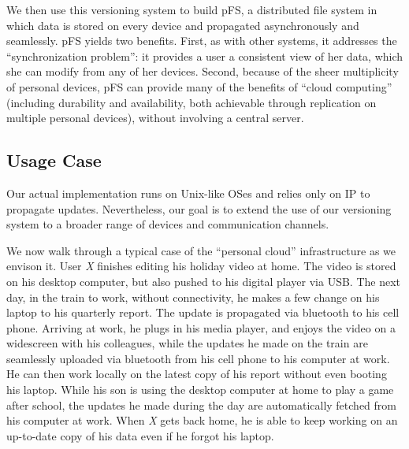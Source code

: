 We then use this versioning system to build pFS, a distributed file
system in which data is stored on every device and propagated
asynchronously and seamlessly. pFS yields two benefits. First, as with
other systems, it addresses the ``synchronization problem'': it provides
a user a consistent view of her data, which she can modify from any of her
devices. Second, because of the sheer multiplicity of personal devices,
pFS can provide many of the benefits of ``cloud computing'' (including
durability and availability, both achievable through replication on
multiple personal devices),  without involving a central server. 

%

\subsection{Usage Case}

Our actual implementation runs on Unix-like OSes and relies only on IP
to propagate updates. Nevertheless, our goal is to extend the use of
our versioning system to a broader range of devices and communication
channels.
\fi

\fi

We now walk through a typical 
case of the ``personal cloud'' infrastructure as we envison it. User
\emph{X} finishes editing his holiday video at home. The video is
stored on his desktop computer, but also pushed to his digital player
via USB. The next day, in the train to work, without connectivity, he
makes a few change on his laptop to his quarterly report. The update
is propagated via bluetooth to his cell phone. Arriving at work, he
plugs in his media player, and enjoys the video on a widescreen with
his colleagues, while the updates he made on the train are seamlessly
uploaded via bluetooth from his cell phone to his computer at work. He
can then work locally on the latest copy of his report without even
booting his laptop. While his son is using the desktop computer at
home to play a game after school, the updates he made during the day
are automatically fetched from his computer at work. When \emph{X}
gets back home, he is able to keep working on an up-to-date copy of
his data even if he forgot his laptop. 

